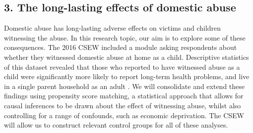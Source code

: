 \documentclass[11pt, a4paper]{article}
\begin{document}

%
%
%
%


\subsection*{3. The long-lasting effects of domestic abuse}

 Domestic abuse has long-lasting adverse effects on victims and children witnessing the abuse. In this research topic, our aim is to explore some of these consequences. The 2016 CSEW included a module asking respondents about whether they witnessed domestic abuse at home as a child. Descriptive statistics of this dataset revealed that those who reported to have witnessed abuse as a child were significantly more likely to report long-term health problems, and live in a single parent household as an adult \cite{ONSChildhood}. We will consolidate and extend these findings using propensity score matching, a statistical approach that allows for causal inferences to be drawn about the effect of witnessing abuse, whilst also controlling for a range of confounds, such as economic deprivation. The CSEW will allow us to construct relevant control groups for all of these analyses.
\end{document}
